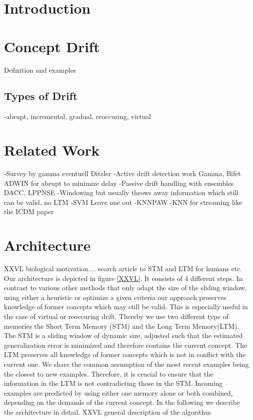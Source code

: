 \documentclass[conference]{IEEEtran}
\begin{document}
\IEEEpeerreviewmaketitle

\section{Introduction}
\section{Concept Drift}
Definition and examples
\subsection{Types of Drift}
-abrupt, incremental, gradual, reoccuring, virtual
\section{Related Work}
-Survey by gamma eventuell Ditzler
-Active drift detection work Gamma, Bifet ADWIN for abrupt to minimize delay
-Passive drift handling with ensembles DACC, LPPNSE
-Windowing but usually throws away information which still can be valid, no LTM
  -SVM Leave one out
  -KNNPAW 
-KNN for streaming like the ICDM paper


\section{Architecture}
XXVL biological motivation.... search article to STM and LTM for humans etc.
Our architecture is depicted in figure \ref{XXVL}. It consists of 4 different steps. 
In contrast to various other methods that only adapt the size of the sliding window, using either a heuristic \cite{XXVL} or optimize a given criteria \cite{XXVL} 
our approach preserves knowledge of former concepts which may still be valid. This is especially useful in the case of virtual or reoccuring drift.
Thereby we use two different type of memories the Short Term Memory (STM) and the Long Term Memory(LTM). The STM is a sliding window of dynamic size, adjusted such that the
estimated generalization error is minimized and therefore contains the current concept.
The LTM preserves all knowledge of former concepts which is not in conflict with the current one. We share the common assumption of the most recent examples
being the closest to new examples. Therefore, it is crucial to ensure that the information in the LTM is not contradicting those in the STM. Incoming examples are predicted
by using either one memory alone or both combined, depending on the demands of the current concept. In the following we describe the architecture in detail.
XXVL general description of the algorithm
\end{document}
